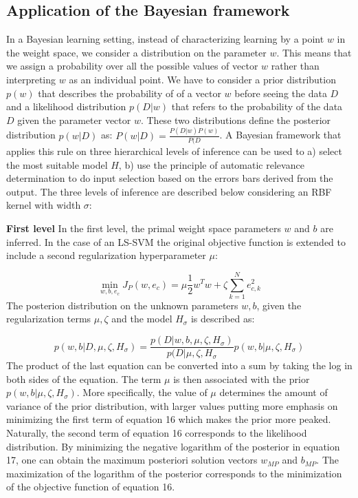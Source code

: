 \documentclass[conference,compsoc]{IEEEtran}
\begin{document}
\subsection{Application of the Bayesian framework}


In a Bayesian learning setting, instead of characterizing learning by a point $w$ in the weight space, we consider a distribution on the parameter $w$. This means that we assign a probability over all the possible values of vector $w$ rather than interpreting $w$ as an individual point. We have to consider a prior distribution $p(w)$ that describes the probability of of a vector $w$ before seeing the data $D$ and a likelihood distribution $p(D|w)$ that refers to the probability of the data $D$ given the parameter vector $w$. These two distributions define the posterior distribution $p(w|D)$ as: $P(w|D)=\frac{P(D|w)P(w)}{P(D}$.
A Bayesian framework that applies this rule on three hierarchical levels of inference can be used to a) select the most suitable model $H$, b) use the principle of automatic relevance determination to do input selection based on the errors bars derived from the output. The three levels of inference are described below considering an RBF kernel with width $\sigma$:

\textbf{First level} In the first level, the primal weight space parameters $w$ and $b$ are inferred. In the case of an LS-SVM the original objective function is extended to include a second regularization hyperparameter $\mu$:

\begin{equation}
\min\limits_{w,b,e_c} J_P(w,e_c) = \mu \frac{1}{2}w^Tw + \zeta \sum_{k=1}^{N}e_{c,k}^2
\end{equation}
The posterion distribution on the unknown parameters $w,b$, given the regularization terms $\mu,\zeta$ and the model $H_\sigma$ is described as:

\begin{equation}
p(w,b|D,\mu,\zeta,H_\sigma) = \frac{p(D|w,b,\mu,\zeta,H_\sigma)}{p(D|\mu,\zeta,H_\sigma}p(w,b|\mu,\zeta,H_\sigma)
\end{equation}
The product of the last equation can be converted into a sum by taking the log in both sides of the equation. The term $\mu$ is then associated with the prior $p(w,b|\mu,\zeta,H_\sigma)$. More specifically, the value of $\mu$ determines the amount of variance of the prior distribution, with larger values putting more emphasis on minimizing the first term of equation 16 which makes the prior more peaked. Naturally, the second term of equation 16 corresponds to the likelihood distribution. By minimizing the negative logarithm of the posterior in equation 17, one can obtain the maximum posteriori solution vectors $w_{MP}$ and $b_{MP}$. The maximization of the logarithm of the posterior corresponds to the minimization of the objective function of equation 16.
\end{document}
